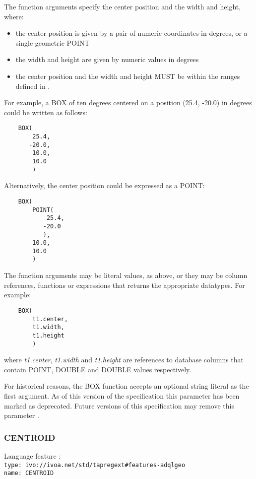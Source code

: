 \documentclass[11pt,a4paper]{ivoa}
\begin{document}
The function arguments specify the center position and the width and height,
where:
\begin{itemize}
    \item the center position is given by a pair of numeric coordinates
    in degrees, or a single geometric POINT
    \item the width and height are given by numeric values in degrees
    \item the center position and the width and height MUST be within the ranges defined in
    .
\end{itemize}

For example, a BOX of ten degrees centered on a position
(25.4, -20.0) in degrees could be written as follows:
\begin{verbatim}
    BOX(
        25.4,
       -20.0,
        10.0,
        10.0
        )
\end{verbatim}

Alternatively, the center position could be expressed as a POINT:
\begin{verbatim}
    BOX(
        POINT(
            25.4,
           -20.0
           ),
        10.0,
        10.0
        )
\end{verbatim}

The function arguments may be literal values, as above, or they may be
column references, functions or expressions that returns the appropriate
datatypes.
For example:
\begin{verbatim}
    BOX(
        t1.center,
        t1.width,
        t1.height
        )
\end{verbatim}
where \textit{t1.center}, \textit{t1.width} and \textit{t1.height}
are references to database columns that contain POINT, DOUBLE
and DOUBLE values respectively.

For historical reasons, the BOX function accepts an optional string literal as
the first argument.
As of this version of the specification this parameter has been
marked as deprecated.
Future versions of this specification may remove this parameter
.

\subsubsection{CENTROID}
\label{sec:functions.geom.centroid}
{\footnotesize Language feature :}\\
{\footnotesize \verb|type: ivo://ivoa.net/std/tapregext#features-adqlgeo|}\\
{\footnotesize \verb|name: CENTROID|}\\
\end{document}
